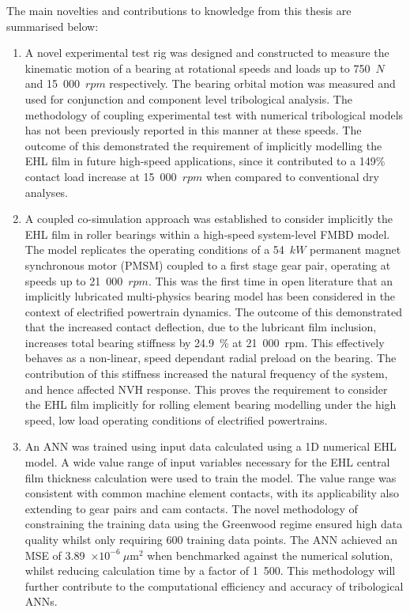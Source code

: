 The main novelties and contributions to knowledge from this thesis are summarised below:

\begin{enumerate}
	\item A novel experimental test rig was designed and constructed to measure the kinematic motion of a bearing at rotational speeds and loads up to 750~$N$ and 15~000~$rpm$ respectively. The bearing orbital motion was measured and used for conjunction and component level tribological analysis. The methodology of coupling experimental test with numerical tribological models has not been previously reported in this manner at these speeds. The outcome of this demonstrated the requirement of implicitly modelling the EHL film in future high-speed applications, since it contributed to a 149\% contact load increase at 15~000~$rpm$ when compared to conventional dry analyses.
	
	\item A coupled co-simulation approach was established to consider implicitly the EHL film in roller bearings within a high-speed system-level FMBD model. The model replicates the operating conditions of a 54~$kW$ permanent magnet synchronous motor (PMSM) coupled to a first stage gear pair, operating at speeds up to 21~000~$rpm$. This was the first time in open literature that an implicitly lubricated multi-physics bearing model has been considered in the context of electrified powertrain dynamics. The outcome of this demonstrated that the increased contact deflection, due to the lubricant film inclusion, increases total bearing stiffness by 24.9~\% at 21~000~rpm. This effectively behaves as a non-linear, speed dependant radial preload on the bearing. The contribution of this stiffness increased the natural frequency of the system, and hence affected NVH response. This proves the requirement to consider the EHL film implicitly for rolling element bearing modelling under the high speed, low load operating conditions of electrified powertrains.
	
	\item An ANN was trained using input data calculated using a 1D numerical EHL model. A wide value range of input variables necessary for the EHL central film thickness calculation were used to train the model. The value range was consistent with common machine element contacts, with its applicability also extending to gear pairs and cam contacts. The novel methodology of constraining the training data using the Greenwood regime ensured high data quality whilst only requiring 600 training data points. The ANN achieved an MSE of 3.89~$\times 10^{-6}~\mu \mathrm{m}^2$ when benchmarked against the numerical solution, whilst reducing calculation time by a factor of 1~500. This methodology will further contribute to the computational efficiency and accuracy of tribological ANNs.
	

\end{enumerate}
